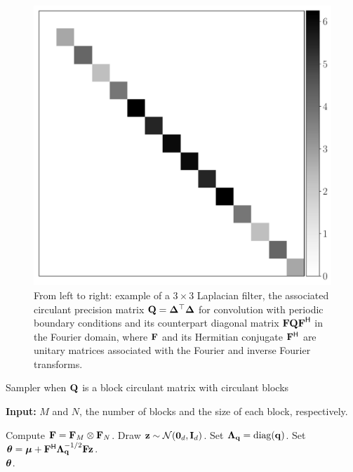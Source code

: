 \documentclass[nohypdvips,onefignum,onetabnum]{siamart171218}
\begin{document}
\begin{figure}
  \mbox{{\includegraphics[scale=0.17]{images/circulant_Four.pdf}}}
  \caption{From left to right: example of a $3 \times 3$ Laplacian filter, the associated circulant precision matrix $\mathbf{Q} = \mathbf{\Delta}^{\top}\mathbf{\Delta}$ for convolution with periodic boundary conditions and its counterpart diagonal matrix $\mathbf{FQF}^{\mathsf{H}}$ in the Fourier domain, where $\mathbf{F}$ and its Hermitian conjugate $\mathbf{F}^{\mathsf{H}}$ are unitary matrices associated with the Fourier and inverse Fourier transforms.}
  \label{fig:circulant}
\end{figure}
%
\begin{algorithm}
  \caption{Sampler when $\mathbf{Q}$ is a block circulant matrix with circulant blocks}
  \label{algo:circulant}
  \hspace*{\algorithmicindent} \textbf{Input:} $M$ and $N$, the number of blocks and the size of each block, respectively.
  \begin{algorithmic}[1]
    \State Compute $\mathbf{F} = \mathbf{F}_M \otimes \mathbf{F}_N$. 
    \State Draw $\mathbf{z} \sim \mathcal{N}(\mathbf{0}_d,\mathbf{I}_d)$.
    \State Set $\mathbf{\Lambda}_{\mathbf{q}} = \mathrm{diag}(\mathbf{q})$. 
      \State Set $\boldsymbol{\theta} = \boldsymbol{\mu} + \mathbf{F}^{\mathsf{H}}\mathbf{\Lambda}_{\mathbf{q}}^{-1/2}\mathbf{Fz}$.\\
    \Return $\boldsymbol{\theta}$.
  \end{algorithmic}
\end{algorithm}
\end{document}

